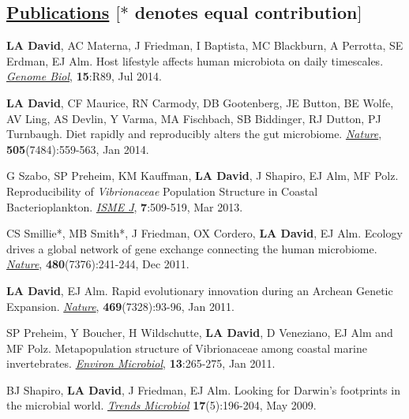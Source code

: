 \documentclass[overlapped,line,11pt]{res}
\begin{document}
\begin{resume}
\section{\underline{\sc Publications} \hspace{2.95in} \sc $[\ast$ denotes equal
      contribution$]$}

\vspace{.25in}

\begin{revnumerate}[11]

\item {\textbf{LA David}, AC Materna, J Friedman, I Baptista, MC
  Blackburn, A Perrotta, SE Erdman, EJ Alm.  Host lifestyle affects
  human microbiota on daily timescales.
  \emph{\underline{Genome Biol}}, \textbf{15}:R89, Jul 2014.}

\item {\textbf{LA David}, CF Maurice, RN Carmody, DB Gootenberg, JE
  Button, BE Wolfe, AV Ling, AS Devlin, Y Varma, MA Fischbach, SB
  Biddinger, RJ Dutton, PJ Turnbaugh.  Diet rapidly and reproducibly
  alters the gut microbiome. \emph{\underline{Nature}},
  \textbf{505}(7484):559-563, Jan 2014.}

\item {G Szabo, SP Preheim, KM Kauffman, \textbf{LA David}, J Shapiro,
  EJ Alm, MF Polz.  Reproducibility of \emph{Vibrionaceae} Population
  Structure in Coastal Bacterioplankton. \emph{\underline{ISME J}},
  \textbf{7}:509-519, Mar 2013.}

\item {CS Smillie*, MB Smith*, J Friedman, OX Cordero, \textbf{LA
    David}, EJ Alm.  Ecology drives a global network of gene exchange
  connecting the human microbiome. \emph{\underline{Nature}},
  \textbf{480}(7376):241-244, Dec 2011.}

\item {\textbf{LA David}, EJ Alm.  Rapid evolutionary innovation during
  an Archean Genetic Expansion.  \emph{\underline{Nature}},
  \textbf{469}(7328):93-96, Jan 2011.}

\vspace*{1mm}
\item {SP Preheim, Y Boucher, H Wildschutte, \textbf{LA David},
  D Veneziano, EJ Alm and MF Polz.  Metapopulation
  structure of Vibrionaceae among coastal marine
  invertebrates. \emph{\underline{Environ Microbiol}}, \textbf{13}:265-275, Jan 2011.} 

\vspace*{1mm}
\item {BJ Shapiro, \textbf{LA David}, J Friedman, EJ Alm. Looking for
Darwin's footprints in the microbial world.  \emph{\underline{Trends Microbiol}}
\textbf{17}(5):196-204, May 2009.}


\end{revnumerate}
\end{resume}
\end{document}
